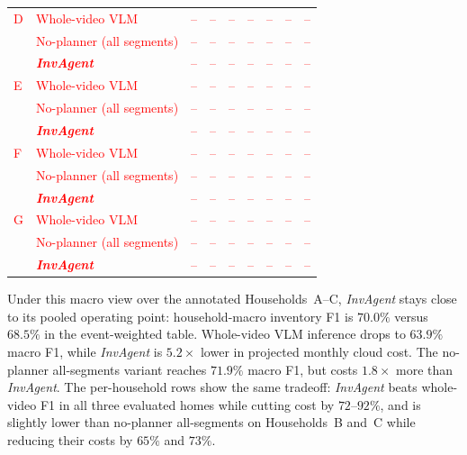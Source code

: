 \documentclass[sigconf,anonymous,nonacm]{acmart}
\newcommand{\scaffold}[1]{\textcolor{red}{#1}}
\newcommand{\sys}{\textit{InvAgent}\xspace}
\begin{document}
\begin{table}[t]
\begin{tabular}{llrrrrrrr}
\scaffold{D} & \scaffold{Whole-video VLM} & \scaffold{--} & \scaffold{--} & \scaffold{--} & \scaffold{--} & \scaffold{--} & \scaffold{--} & \scaffold{--} \\
& \scaffold{No-planner (all segments)} & \scaffold{--} & \scaffold{--} & \scaffold{--} & \scaffold{--} & \scaffold{--} & \scaffold{--} & \scaffold{--} \\
& \scaffold{\textbf{\sys}} & \scaffold{--} & \scaffold{--} & \scaffold{--} & \scaffold{--} & \scaffold{--} & \scaffold{--} & \scaffold{--} \\
\midrule
\scaffold{E} & \scaffold{Whole-video VLM} & \scaffold{--} & \scaffold{--} & \scaffold{--} & \scaffold{--} & \scaffold{--} & \scaffold{--} & \scaffold{--} \\
& \scaffold{No-planner (all segments)} & \scaffold{--} & \scaffold{--} & \scaffold{--} & \scaffold{--} & \scaffold{--} & \scaffold{--} & \scaffold{--} \\
& \scaffold{\textbf{\sys}} & \scaffold{--} & \scaffold{--} & \scaffold{--} & \scaffold{--} & \scaffold{--} & \scaffold{--} & \scaffold{--} \\
\midrule
\scaffold{F} & \scaffold{Whole-video VLM} & \scaffold{--} & \scaffold{--} & \scaffold{--} & \scaffold{--} & \scaffold{--} & \scaffold{--} & \scaffold{--} \\
& \scaffold{No-planner (all segments)} & \scaffold{--} & \scaffold{--} & \scaffold{--} & \scaffold{--} & \scaffold{--} & \scaffold{--} & \scaffold{--} \\
& \scaffold{\textbf{\sys}} & \scaffold{--} & \scaffold{--} & \scaffold{--} & \scaffold{--} & \scaffold{--} & \scaffold{--} & \scaffold{--} \\
\midrule
\scaffold{G} & \scaffold{Whole-video VLM} & \scaffold{--} & \scaffold{--} & \scaffold{--} & \scaffold{--} & \scaffold{--} & \scaffold{--} & \scaffold{--} \\
& \scaffold{No-planner (all segments)} & \scaffold{--} & \scaffold{--} & \scaffold{--} & \scaffold{--} & \scaffold{--} & \scaffold{--} & \scaffold{--} \\
& \scaffold{\textbf{\sys}} & \scaffold{--} & \scaffold{--} & \scaffold{--} & \scaffold{--} & \scaffold{--} & \scaffold{--} & \scaffold{--} \\
\bottomrule
\end{tabular}
\end{table}

Under this macro view over the annotated Households~A--C, \sys stays
close to its pooled operating point: household-macro inventory F1 is
$70.0\%$ versus $68.5\%$ in the event-weighted table. Whole-video VLM
inference drops to $63.9\%$ macro F1, while \sys is $5.2\times$
lower in projected monthly cloud cost. The no-planner all-segments
variant reaches $71.9\%$ macro F1, but costs $1.8\times$ more than
\sys. The per-household rows show the same tradeoff: \sys beats whole-video F1
in all three evaluated homes while cutting cost by $72$--$92\%$, and is
slightly lower than no-planner all-segments on Households~B and~C while
reducing their costs by $65\%$ and $73\%$.
\end{document}
